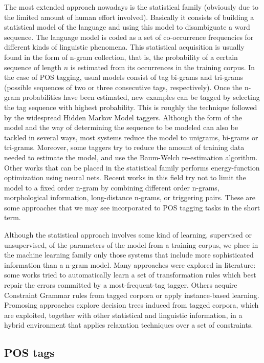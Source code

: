 The most extended approach nowadays is the statistical family
(obviously due to the limited amount of human effort involved).
Basically it consists of building a statistical model of the language
and using this model to disambiguate a word sequence. The language
model is coded as a set of co-occurrence frequencies for different
kinds of linguistic phenomena. This statistical acquisition is usually
found in the form of n-gram collection, that is, the probability of a
certain sequence of length $n$ is estimated from its occurrences in
the training corpus. In the case of POS tagging, usual models consist
of tag bi-grams and tri-grams (possible sequences of two or three
consecutive tags, respectively). Once the n-gram probabilities have
been estimated, new examples can be tagged by selecting the tag
sequence with highest probability. This is roughly the technique
followed by the widespread Hidden Markov Model taggers. Although the
form of the model and the way of determining the sequence to be
modeled can also be tackled in several ways, most systems reduce the
model to unigrams, bi-grams or tri-grams. Moreover, some taggers try
to reduce the amount of training data needed to estimate the model,
and use the Baum-Welch re-estimation algorithm. Other works that can
be placed in the statistical family performs energy-function
optimization using neural nets. Recent works in this field try not to
limit the model to a fixed order n-gram by combining different order
n-grams, morphological information, long-distance n-grams, or
triggering pairs. These are some approaches that we may see
incorporated to POS tagging tasks in the short term.

Although the statistical approach involves some kind of learning,
supervised or unsupervised, of the parameters of the model from a
training corpus, we place in the machine learning family only those
systems that include more sophisticated information than a n-gram
model. Many approaches were explored in literature: some works tried
to automatically learn a set of transformation rules which best repair
the errors committed by a most-frequent-tag tagger. Others acquire
Constraint Grammar rules from tagged corpora or apply instance-based
learning. Promosing approaches explore decision trees induced from
tagged corpora, which are exploited, together with other statistical
and linguistic information, in a hybrid environment that applies
relaxation techniques over a set of constraints.

\subsection{POS tags}

